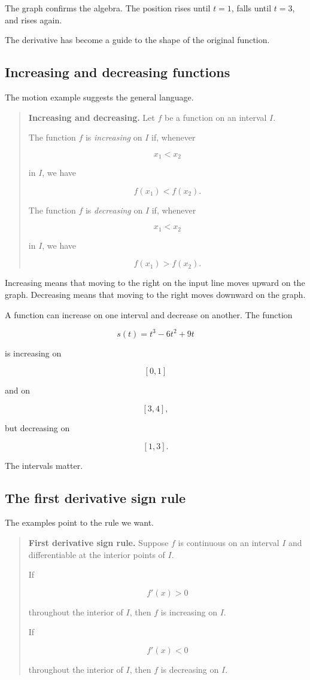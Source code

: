 The graph confirms the algebra.  The position rises until \(t=1\), falls until
\(t=3\), and rises again.

The derivative has become a guide to the shape of the original function.

\subsection{Increasing and decreasing functions}
\label{subsec:increasing-decreasing-definitions}

The motion example suggests the general language.

\begin{quote}
\textbf{Increasing and decreasing.}
Let \(f\) be a function on an interval \(I\).

The function \(f\) is \emph{increasing} on \(I\) if, whenever

\[
x_1<x_2
\]

in \(I\), we have

\[
f(x_1)<f(x_2).
\]

The function \(f\) is \emph{decreasing} on \(I\) if, whenever

\[
x_1<x_2
\]

in \(I\), we have

\[
f(x_1)>f(x_2).
\]
\end{quote}

Increasing means that moving to the right on the input line moves upward on the
graph.  Decreasing means that moving to the right moves downward on the graph.

A function can increase on one interval and decrease on another.  The function

\[
s(t)=t^3-6t^2+9t
\]

is increasing on

\[
[0,1]
\]

and on

\[
[3,4],
\]

but decreasing on

\[
[1,3].
\]

The intervals matter.

\subsection{The first derivative sign rule}
\label{subsec:first-derivative-sign-rule}

The examples point to the rule we want.

\begin{quote}
\textbf{First derivative sign rule.}
Suppose \(f\) is continuous on an interval \(I\) and differentiable at the interior
points of \(I\).

If

\[
f'(x)>0
\]

throughout the interior of \(I\), then \(f\) is increasing on \(I\).

If

\[
f'(x)<0
\]

throughout the interior of \(I\), then \(f\) is decreasing on \(I\).
\end{quote}

